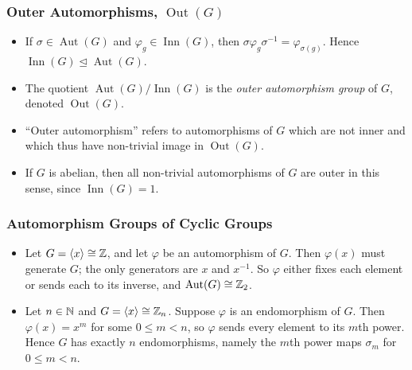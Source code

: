 \documentclass[../Odyssey_Project.tex]{subfiles}
\begin{document}
\subsubsection*{Outer Automorphisms, $\operatorname{Out}(G)$}
\begin{itemize}
    \item If $\sigma \in \operatorname{Aut}(G)$ and $\varphi_g \in \operatorname{Inn}(G)$, then $\sigma \varphi_g \sigma^{-1} = \varphi_{\sigma(g)}$. Hence $\operatorname{Inn}(G) \trianglelefteq \operatorname{Aut}(G)$.
    \item The quotient $\operatorname{Aut}(G)/\operatorname{Inn}(G)$ is the \emph{outer automorphism group} of $G$, denoted $\operatorname{Out}(G)$.
    \item ``Outer automorphism'' refers to automorphisms of $G$ which are not inner and which thus have non-trivial image in $\operatorname{Out}(G)$.
    \item If $G$ is abelian, then all non-trivial automorphisms of $G$ are outer in this sense, since $\operatorname{Inn}(G) = 1$.
\end{itemize}

\subsubsection*{Automorphism Groups of Cyclic Groups}
\begin{itemize}
    \item Let $G = \langle x \rangle \cong \mathbb{Z}$, and let $\varphi$ be an automorphism of $G$. Then $\varphi(x)$ must generate $G$; the only generators are $x$ and $x^{-1}$. So $\varphi$ either fixes each element or sends each to its inverse, and $\operatorname{Aut}(G) \cong \mathbb{Z}_2$.
    \item Let $n \in \mathbb{N}$ and $G = \langle x \rangle \cong \mathbb{Z}_n$. Suppose $\varphi$ is an endomorphism of $G$. Then $\varphi(x) = x^m$ for some $0 \leq m < n$, so $\varphi$ sends every element to its $m$th power. Hence $G$ has exactly $n$ endomorphisms, namely the $m$th power maps $\sigma_m$ for $0 \leq m < n$.
\end{itemize}
\end{document}
